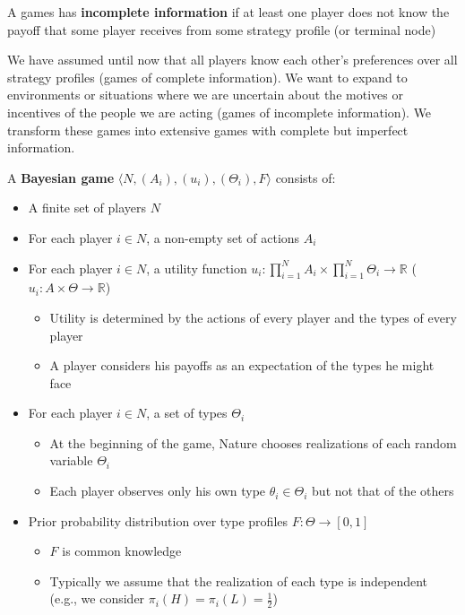 \documentclass{report}
\begin{document}
A games has \textbf{incomplete information} if at least one player does not know the payoff that some player receives from some strategy profile (or terminal node) \bigskip

We have assumed until now that all players know each other's preferences over all strategy profiles (games of complete information). We want to expand to environments or situations where we are uncertain about the motives or incentives of the people we are acting (games of incomplete information). We transform these games into extensive games with complete but imperfect information. \bigskip \bigskip

A \textbf{Bayesian game} $\langle N,(A_i),(u_i),(\Theta_i),F \rangle$ consists of:
\begin{itemize}
	\item{A finite set of players $N$}
	\item{For each player $i \in N$, a non-empty set of actions $A_i$}
	\item{For each player $i \in N$, a utility function $u_i: \prod_{i=1}^N A_i \times \prod_{i=1}^N \Theta_i \rightarrow \mathbb{R}$ \hspace{5pt} ($u_i: A \times \Theta \rightarrow \mathbb{R}$)}
		\begin{itemize}
			\item Utility is determined by the actions of every player and the types of every player
			\item A player considers his payoffs as an expectation of the types he might face
		\end{itemize}
	\item For each player $i \in N$, a set of types $\Theta_i$
		\begin{itemize}
			\item At the beginning of the game, Nature chooses realizations of each random variable $\Theta_i$
			\item Each player observes only his own type $\theta_i \in \Theta_i$ but not that of the others
		\end{itemize}
	\item Prior probability distribution over type profiles $F: \Theta \rightarrow [0,1]$
		\begin{itemize}
			\item $F$ is common knowledge
			\item Typically we assume that the realization of each type is independent\\ (e.g., we consider $\pi_i(H) = \pi_i(L) = \frac{1}{2}$)
		\end{itemize}
\end{itemize} \bigskip \bigskip
\end{document}
